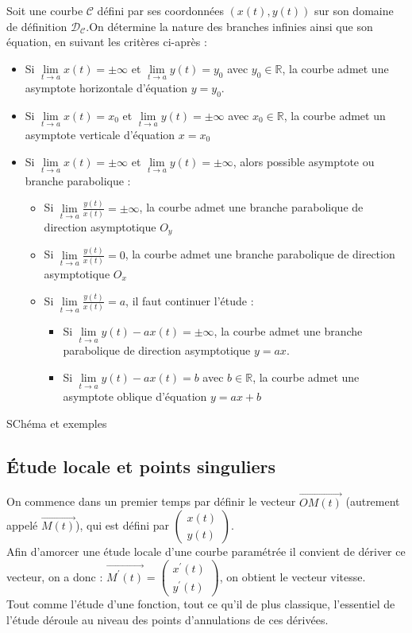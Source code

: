 \begin{prop}
Soit une courbe $\mathscr{C}$ défini par ses coordonnées $(x(t),y(t))$ sur son domaine de définition $\mathscr{D}_\mathscr{C}$.On détermine la nature des branches infinies ainsi que son équation, en suivant les critères ci-après :
\begin{itemize}
    \item Si $\lim\limits_{t\to a}x(t)=\pm\infty$ et $\lim\limits_{t\to a}y(t)=y_0$ avec $y_0\in\mathbb{R}$, la courbe admet une asymptote horizontale d'équation $y=y_0$.
    \item Si $\lim\limits_{t\to a}x(t)=x_0$ et $\lim\limits_{t\to a}y(t)=\pm\infty$ avec $x_0\in\mathbb{R}$, la courbe admet un asymptote verticale d'équation $x=x_0$
    \item Si $\lim\limits_{t\to a}x(t)=\pm\infty$ et $\lim\limits_{t\to a}y(t)=\pm\infty$, alors possible asymptote ou branche parabolique :
    \begin{itemize}
        \item Si $\lim\limits_{t\to a}\frac{y(t)}{x(t)}=\pm\infty$, la courbe admet une branche parabolique de direction asymptotique $O_y$
        \item Si $\lim\limits_{t\to a}\frac{y(t)}{x(t)}=0$, la courbe admet une branche parabolique de direction asymptotique $O_x$
        \item Si $\lim\limits_{t\to a}\frac{y(t)}{x(t)}=a$, il faut continuer l'étude :
        \begin{itemize}
            \item Si $\lim\limits_{t\to a} y(t)-ax(t)=\pm\infty$, la courbe admet une branche parabolique de direction asymptotique $y=ax$.
            \item Si $\lim\limits_{t\to a} y(t)-ax(t)=b$ avec $b\in\mathbb{R}$, la courbe admet une asymptote oblique d'équation $y=ax+b$
        \end{itemize}
    \end{itemize}
\end{itemize}
\end{prop}
SChéma et exemples
\subsection{Étude locale et points singuliers}
On commence dans un premier temps par  définir le vecteur $\overrightarrow{OM(t)}$ (autrement appelé $\overrightarrow{M(t)}$), qui est défini par $\begin{pmatrix}x(t)\\y(t)\end{pmatrix}$.\\
Afin d'amorcer une étude locale d'une courbe paramétrée il convient de dériver ce vecteur, on a donc : $\overrightarrow{M^{\prime}(t)}=\begin{pmatrix}x^{\prime}(t)\\y^{\prime}(t)\end{pmatrix}$, on obtient le vecteur vitesse.\\
Tout comme l'étude d'une fonction, tout ce qu'il de plus classique, l'essentiel de l'étude déroule au niveau des points d'annulations de ces dérivées.

